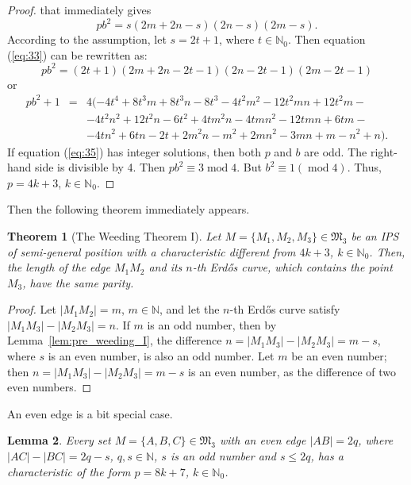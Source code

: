 \documentclass[a4paper,14pt]{article} %
\theoremstyle{plain}
\newtheorem{theorem}{Theorem}[section]
\newtheorem{lemma}[theorem]{Lemma}
\theoremstyle{definition}
\begin{document}
\begin{proof}
	that immediately gives
	\begin{equation}
		\label{eq:33}
		pb^2=s(2m+2n-s)(2n-s)(2m-s).
	\end{equation}
	According to the assumption, let $s=2t+1$, where $t\in\mathbb{N}_0$.
	Then equation (\ref{eq:33}) can be rewritten as:
	\begin{equation}
		\label{eq:34.2}
		pb^2=(2t+1)(2m+2n-2t-1)(2n-2t-1)(2m-2t-1)
	\end{equation}
	or
	\begin{eqnarray}
		pb^2+1 &=&4(-4t^4+8t^3m+8t^3n-8t^3-4t^2m^2-12t^2mn+12t^2m- {}\nonumber\\
			 &     &-4t^2n^2+12t^2n-6t^2+4tm^2n-4tmn^2-12tmn+6tm- {}\nonumber\\
			 &     &-4tn^2+6tn-2t+2m^2n-m^2+2mn^2-3mn+m-n^2+n).%
	\label{eq:35}
	\end{eqnarray}
	If equation (\ref{eq:35}) has integer solutions, then both $p$ and $b$ are odd.
	The right-hand side is divisible by 4. Then $pb^2\equiv3\operatorname{mod}{4}$.
	But $b^{2}\equiv1(\operatorname{mod}4)$.
	Thus, $p=4k+3$, $k\in \mathbb{N}_{0}$.
\end{proof}

Then the following theorem immediately appears.

\begin{theorem}[The Weeding Theorem I]
	\label{thm:weeding_I}
	Let $M = \{M_1, M_2, M_3\} \in \mathfrak{M}_3$ be an IPS of semi-general position with a characteristic different from $4k+3$, $k \in \mathbb{N}_0$. Then, the length of the edge $M_1 M_2$ and its $n$-th Erdős curve, which contains the point $M_3$, have the same parity.
\end{theorem}

\begin{proof}
	Let $|M_1 M_2| = m$, $m \in \mathbb{N}$, and let the $n$-th Erdős curve satisfy $|M_1 M_3| - |M_2 M_3| = n$.
	If $m$ is an odd number, then by Lemma~\ref{lem:pre_weeding_I}, the difference $n = |M_1 M_3| - |M_2 M_3| = m - s$, where $s$ is an even number, is also an odd number.
	Let $m$ be an even number; then $n = |M_1 M_3| - |M_2 M_3| = m - s$ is an even number, as the difference of two even numbers.
\end{proof}

An even edge is a bit special case.

\begin{lemma}
	\label{lem:pre_weeding_II}
	Every set $M = \{A, B, C\} \in \mathfrak{M}_3$ with an even edge $|AB| = 2q$, where $|AC| - |BC| = 2q - s$, $q, s \in \mathbb{N}$, $s$ is an odd number and $s \leq 2q$, has a characteristic of the form $p = 8k + 7$, $k \in \mathbb{N}_0$.
\end{lemma}
\end{document}

